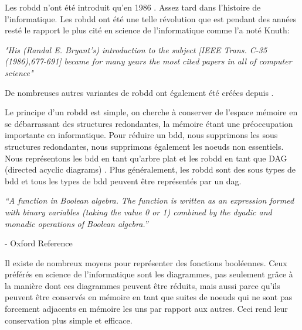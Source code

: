 \documentclass[french]{article}
\begin{document}
Les robdd n'ont été introduit qu'en 1986 \cite{bryant_graph}. Assez tard dans l'histoire de l'informatique. Les robdd ont été une telle révolution que \cite{bryant_graph} est pendant des années resté le rapport le plus cité en science de l'informatique comme l'a noté Knuth:

\begin{center}
    \emph{"His (Randal E. Bryant's) introduction to the subject [IEEE Trans. C-35 (1986),677-691] became for many years the most cited papers in all of computer science"}\cite{knuth}
\end{center}

De nombreuses autres variantes de robdd ont également été créées depuis \cite{wegner}.\medskip

Le principe d'un robdd est simple, on cherche à conserver de l'espace mémoire en se débarrassant des structures redondantes, la mémoire étant une préoccupation importante en informatique. Pour réduire un bdd, nous supprimons les sous structures redondantes, nous supprimons également les noeuds non essentiels. Nous représentons les bdd en tant qu'arbre plat et les robdd en tant que DAG (directed acyclic diagrams) \cite{flajolet_automata}. Plus généralement, les robdd sont des sous types de bdd et tous les types de bdd peuvent être représentés par un dag.\medskip

\begin{center}
\emph{“A function in Boolean algebra. The function is written as an expression formed with binary variables (taking the value 0 or 1) combined by the dyadic and monadic operations of Boolean algebra.”} 
\end{center}

- Oxford Reference 
\vspace{5mm} 

Il existe de nombreux moyens pour représenter des fonctions booléennes. Ceux préférés en science de l'informatique sont les diagrammes, pas seulement grâce à la manière dont ces diagrammes peuvent être réduits, mais aussi parce qu'ils peuvent être conservés en mémoire en tant que suites de noeuds qui ne sont pas forcement adjacents en mémoire les uns par rapport aux autres. Ceci rend leur conservation plus simple et efficace.
\end{document}
